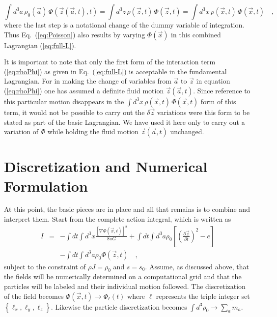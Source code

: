 \documentclass{article}
\def\a{{\vec a}}
\def\x{{\vec x}}
\def\z{{\vec z}}
\def\l{{\ell}}
\def\_,{{\quad ,}}
\begin{document}
\begin{equation}\label{eq:rhoPhi}
    \int\!\! d^3a\, \rho_0(\a)\, \Phi(\z(\a,t),t) =
    \int\!\! d^3z\, \rho(\z,t)\, \Phi(\z,t) =
    \int\!\! d^3x\, \rho(\x,t)\, \Phi(\x,t) \_,
\end{equation}
%
where the last step is a notational change of the dummy variable
of integration.  Thus Eq.~(\ref{eq:Poisson}) also results by varying
$\Phi(\x)$ in this combined Lagrangian (\ref{eq:full-L}).

It is important to note that only the first form of the interaction term
(\ref{eq:rhoPhi}) as given in Eq.~(\ref{eq:full-L}) is acceptable in the
fundamental Lagrangian.  For in making the change of variables from $\a$ to
$\z$ in equation (\ref{eq:rhoPhi}) one has assumed a definite fluid motion
$\z(\a,t)$. Since reference to this particular motion disappears in the
$\int\!\! d^3x\, \rho(\x,t)\, \Phi(\x,t)$ form of this term, it would not be
possible to carry out the $\delta \z$ variations were this form to be stated
as part of the basic Lagrangian.  We have used it here only to carry out a
variation of $\Phi$ while holding the fluid motion $\z(\a,t)$ unchanged.


\section{Discretization and Numerical Formulation}\label{Disc.}

At this point, the basic pieces are in place and all that remains is to combine
and interpret them.  Start from the complete action integral, which is written
as
\begin{eqnarray}
I  & = & - \int\!\! dt \int\!\! d^3x
           \frac{\left[\nabla \Phi(\x,t)\right]^2}{8 \pi G}
         + \int\!\! dt \int\!\! d^3a \rho_0 \left[ \left(\frac{\partial \z}
          {\partial t}\right)^2 - e \right] \nonumber \\
   &   & - \int\!\! dt \int\!\! d^3 a \rho_0 \Phi(\z,t) \_,
\end{eqnarray}
%
subject to the constraint of $\rho J = \rho_0$ and $s = s_0$.  Assume, as
discussed above, that the fields will be numerically determined on a
computational grid and that the particles will be labeled and their individual
motion followed.  The discretization of the field becomes
$\Phi(\x,t) \rightarrow \Phi_\l(t)$ where $\l$ represents the triple integer
set $\left\{\l_x, \l_y, \l_z\right\}$.  Likewise the particle discretization
becomes $ \int d^3 \rho_0 \rightarrow \sum_{a} m_a$.
\end{document}
